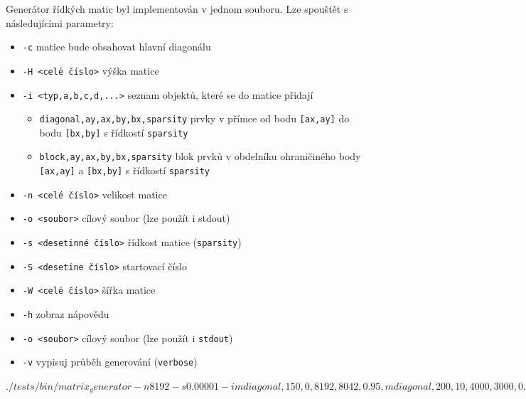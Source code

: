 Generátor řídkých matic byl implementován v jednom souboru. Lze spouštět s následujícími parametry:

\begin{itemize}
	\item \texttt{-c} matice bude obsahovat hlavní diagonálu
	\item \texttt{-H <celé číslo>} výška matice
	\item \texttt{-i <typ,a,b,c,d,...>} seznam objektů, které se do matice přidají
	\begin{itemize}
	\item \texttt{diagonal,ay,ax,by,bx,sparsity} prvky v přímce od bodu \texttt{[ax,ay]} do bodu \texttt{[bx,by]} s řídkostí \texttt{sparsity}
	\item \texttt{block,ay,ax,by,bx,sparsity} blok prvků v obdelníku ohraničiného body \texttt{[ax,ay]} a \texttt{[bx,by]} s řídkostí \texttt{sparsity}
	\end{itemize}
	\item \texttt{-n <celé číslo>} velikost matice
	\item \texttt{-o <soubor>} cílový soubor (lze použít i stdout)
	\item \texttt{-s <desetinné číslo>} řídkost matice (\texttt{sparsity})
	\item \texttt{-S <desetine číslo>} startovací číslo
	\item \texttt{-W <celé číslo>} šířka matice
\end{itemize}

\begin{itemize}
	\item \texttt{-h} zobraz nápovědu
	\item \texttt{-o <soubor>} cílový soubor (lze použít i \texttt{stdout}) 
	\item \texttt{-v} vypisuj průběh generování (\texttt{verbose})
\end{itemize}

\texttt{$ ./tests/bin/matrix_generator -n 8192 -s 0.00001 -i mdiagonal,150,0,8192,8042,0.95,mdiagonal,200,10,4000,3000,0.75,mblockwh,300,1500,256,256,0.95,mblockwh,700,2000,128,128,0.95,mrblocks,10,128,64,64,0.75 -o /tmp/matrix2.mtx$}

